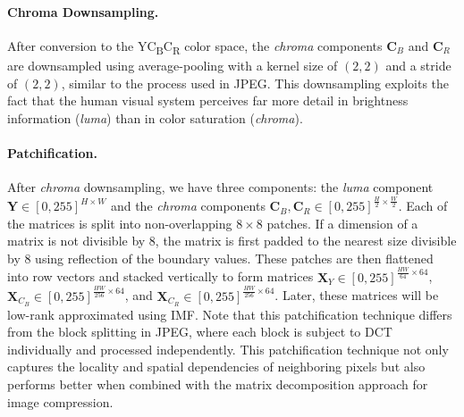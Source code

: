 \paragraph{Chroma Downsampling.} 
After conversion to the YC\textsubscript{B}C\textsubscript{R} color space, the \emph{chroma} components $\bm{C}_B$ and $\bm{C}_R$ are downsampled using average-pooling with a kernel size of $(2, 2)$ and a stride of $(2, 2)$, similar to the process used in JPEG. This downsampling exploits the fact that the human visual system perceives far more detail in brightness information (\emph{luma}) than in color saturation (\emph{chroma}).

\paragraph{Patchification.}
After \emph{chroma} downsampling, we have three components:  the \emph{luma} component $\bm{Y} \in [0, 255]^{H \times W}$ and the \emph{chroma} components $\bm{C}_B, \bm{C}_R \in [0, 255]^{\frac{H}{2} \times \frac{W}{2}}$. Each of the matrices is split into non-overlapping $8 \times 8$ patches. If a dimension of a matrix is not divisible by 8, the matrix is first padded to the nearest size divisible by 8 using reflection of the boundary values. These patches are then flattened into row vectors and stacked vertically to form matrices $\bm{X}_{Y} \in [0, 255]^{\frac{HW}{64} \times 64}$, $\bm{X}_{C_B} \in [0, 255]^{\frac{HW}{256} \times 64}$, and $\bm{X}_{C_R} \in [0, 255]^{\frac{HW}{256} \times 64}$. Later, these matrices will be low-rank approximated using IMF. Note that this patchification technique differs from the block splitting in JPEG, where each block is subject to DCT individually and processed independently. This patchification technique not only captures the locality and spatial dependencies of neighboring pixels but also performs better when combined with the matrix decomposition approach for image compression.

